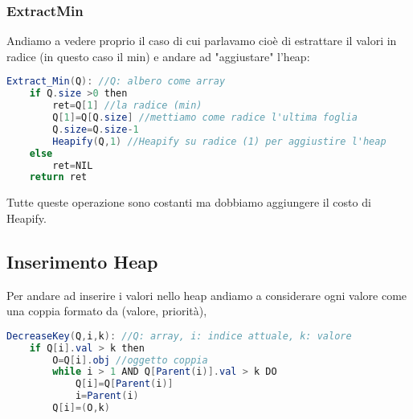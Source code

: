 \subsubsection{ExtractMin}
Andiamo a vedere proprio il caso di cui parlavamo cioè di estrattare il valori in radice (in questo caso il min) e andare ad "aggiustare" l'heap:
\begin{lstlisting}[language=Java]
Extract_Min(Q): //Q: albero come array
    if Q.size >0 then
        ret=Q[1] //la radice (min)
        Q[1]=Q[Q.size] //mettiamo come radice l'ultima foglia
        Q.size=Q.size-1 
        Heapify(Q,1) //Heapify su radice (1) per aggiustire l'heap 
    else 
        ret=NIL 
    return ret
\end{lstlisting}
Tutte queste operazione sono costanti ma dobbiamo aggiungere il costo di Heapify.

\subsection{Inserimento Heap}
Per andare ad inserire i valori nello heap andiamo a considerare ogni valore come una coppia formato da (valore, priorità), 
\begin{lstlisting}[language=Java]
DecreaseKey(Q,i,k): //Q: array, i: indice attuale, k: valore
    if Q[i].val > k then 
        O=Q[i].obj //oggetto coppia
        while i > 1 AND Q[Parent(i)].val > k DO 
            Q[i]=Q[Parent(i)]
            i=Parent(i)
        Q[i]=(O,k)
\end{lstlisting}